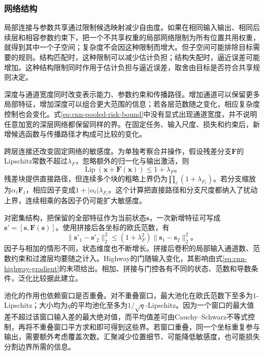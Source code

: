 \subsubsection{网络结构}
\label{sec:cnn-structure-generalization}

局部连接与参数共享通过限制候选映射减少自由度。如果在相同输入输出、相同后续层和相容参数约束下，把一个不共享权重的局部网络限制为所有位置共用权重，就得到其中一个子空间；复杂度不会因这种限制而增大。但子空间可能排除目标需要的规则。结构匹配时，这种限制可以减少估计负担；结构失配时，逼近误差可能增加。这种结构限制同时作用于估计负担与逼近误差，取舍由目标是否符合共享规则决定。

深度与通道宽度同时改变表示能力、参数约束和传播路径。增加通道可以保留更多局部特征，增加深度可以组合更大范围的信息；若各层范数随之变化，相应复杂度控制也会变化。式\eqref{eq:cnn-pooled-risk-bound}中没有显式出现通道宽度，并不说明任意加宽的深层网络都保留同样的界。在固定任务、输入尺度、损失和约束后，新增候选函数与传播路径才构成可比较的变化。

跨层连接还改变固定网络的敏感度。为单独考察合并操作，假设残差分支$\bm F$的Lipschitz常数不超过$\lambda_F$，忽略额外的归一化与输出激活，则
\begin{equation}
  \operatorname{Lip}(\bm x+\bm F(\bm x))\leq1+\lambda_F\text{。}
  \label{eq:cnn-residual-lipschitz}
\end{equation}
残差块提供直接路径，但连续多个块的粗略上界仍为$\prod_\ell(1+\lambda_{F_\ell})$。若分支缩放为$\alpha_\ell\bm F_\ell$，相应因子变成$1+|\alpha_\ell|\lambda_{F_\ell}$。这个计算把直接路径和分支尺度都纳入了扰动上界，连续相乘的各因子仍可能扩大敏感度。

对密集结构，把保留的全部特征作为当前状态$\bm s$，一次新增特征可写成$\bm s'=[\bm s,\bm F(\bm s)]$。使用拼接后各坐标的欧氏范数，有
\begin{equation}
  \lVert\bm s'_1-\bm s'_2\rVert_2^2
  \leq(1+\lambda_F^2)\lVert\bm s_1-\bm s_2\rVert_2^2\text{。}
  \label{eq:cnn-dense-lipschitz}
\end{equation}
因子与相加的情形不同，状态维度也不断增长。拼接后卷积的局部输入通道数、范数约束和过渡层均要随之计入。Highway的门随输入变化，其影响由式\eqref{eq:cnn-highway-gradient}的末项给出。相加、拼接与门控各有不同的状态、范数和导数条件，泛化比较据此建立。

池化的作用也依赖窗口是否重叠。对不重叠窗口，最大池化在欧氏范数下至多为$1$-Lipschitz；大小均为$q$的平均池化至多为$1/\sqrt q$-Lipschitz。因为一个窗口的最大值差不超过该窗口输入差的最大绝对值，而平均值差可由Cauchy--Schwarz不等式控制，再将不重叠窗口平方求和即可得到这些界。若窗口重叠，同一个坐标重复参与输出，需要额外考虑覆盖次数。汇聚减少位置细节、可能降低敏感度，也可能损失分割边界所需的信息。

